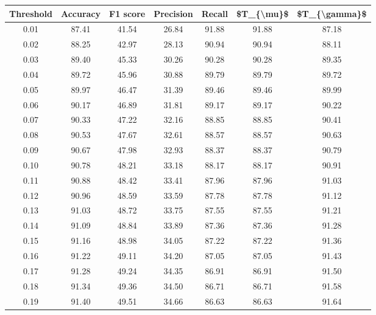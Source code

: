 \begin{tabular}{|c|c|c|c|c|c|c|}
\hline
 Threshold &  Accuracy &  F1 score &  Precision &  Recall &  \$T\_\{\textbackslash mu\}\$ &  \$T\_\{\textbackslash gamma\}\$ \\
\hline
      0.01 &     87.41 &     41.54 &      26.84 &   91.88 &      91.88 &         87.18 \\
      0.02 &     88.25 &     42.97 &      28.13 &   90.94 &      90.94 &         88.11 \\
      0.03 &     89.40 &     45.33 &      30.26 &   90.28 &      90.28 &         89.35 \\
      0.04 &     89.72 &     45.96 &      30.88 &   89.79 &      89.79 &         89.72 \\
      0.05 &     89.97 &     46.47 &      31.39 &   89.46 &      89.46 &         89.99 \\
      0.06 &     90.17 &     46.89 &      31.81 &   89.17 &      89.17 &         90.22 \\
      0.07 &     90.33 &     47.22 &      32.16 &   88.85 &      88.85 &         90.41 \\
      0.08 &     90.53 &     47.67 &      32.61 &   88.57 &      88.57 &         90.63 \\
      0.09 &     90.67 &     47.98 &      32.93 &   88.37 &      88.37 &         90.79 \\
      0.10 &     90.78 &     48.21 &      33.18 &   88.17 &      88.17 &         90.91 \\
      0.11 &     90.88 &     48.42 &      33.41 &   87.96 &      87.96 &         91.03 \\
      0.12 &     90.96 &     48.59 &      33.59 &   87.78 &      87.78 &         91.12 \\
      0.13 &     91.03 &     48.72 &      33.75 &   87.55 &      87.55 &         91.21 \\
      0.14 &     91.09 &     48.84 &      33.89 &   87.36 &      87.36 &         91.28 \\
      0.15 &     91.16 &     48.98 &      34.05 &   87.22 &      87.22 &         91.36 \\
      0.16 &     91.22 &     49.11 &      34.20 &   87.05 &      87.05 &         91.43 \\
      0.17 &     91.28 &     49.24 &      34.35 &   86.91 &      86.91 &         91.50 \\
      0.18 &     91.34 &     49.36 &      34.50 &   86.71 &      86.71 &         91.58 \\
      0.19 &     91.40 &     49.51 &      34.66 &   86.63 &      86.63 &         91.64 \\

\end{tabular}

